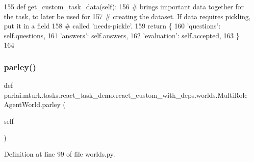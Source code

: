\begin{DoxyCode}
155     \textcolor{keyword}{def }get\_custom\_task\_data(self):
156         \textcolor{comment}{# brings important data together for the task, to later be used for}
157         \textcolor{comment}{# creating the dataset. If data requires pickling, put it in a field}
158         \textcolor{comment}{# called 'needs-pickle'.}
159         \textcolor{keywordflow}{return} \{
160             \textcolor{stringliteral}{'questions'}: self.questions,
161             \textcolor{stringliteral}{'answers'}: self.answers,
162             \textcolor{stringliteral}{'evaluation'}: self.accepted,
163         \}
164 \end{DoxyCode}
\mbox{\label{classparlai_1_1mturk_1_1tasks_1_1react__task__demo_1_1react__custom__with__deps_1_1worlds_1_1MultiRoleAgentWorld_a43ba8c9d5f6e8736371bd2480c63bcf8}} 
\subsubsection{\texorpdfstring{parley()}{parley()}}
{\footnotesize\ttfamily def parlai.\+mturk.\+tasks.\+react\+\_\+task\+\_\+demo.\+react\+\_\+custom\+\_\+with\+\_\+deps.\+worlds.\+Multi\+Role\+Agent\+World.\+parley (\begin{DoxyParamCaption}\item[{}]{self }\end{DoxyParamCaption})}



Definition at line 99 of file worlds.\+py.


